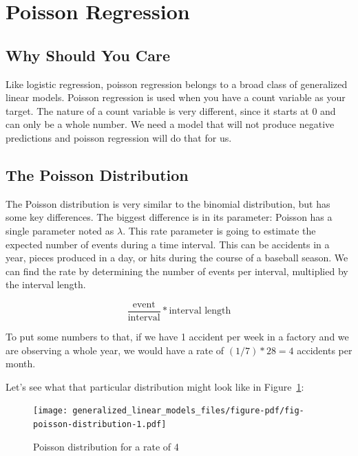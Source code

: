\documentclass[
  letterpaper,
]{krantz}
\begin{document}
\section{Poisson Regression}\label{poisson-regression}

\subsection{Why Should You Care}\label{why-should-you-care-1}

Like logistic regression, poisson regression belongs to a broad class of
generalized linear models. Poisson regression is used when you have a
count variable as your target. The nature of a count variable is very
different, since it starts at 0 and can only be a whole number. We need
a model that will not produce negative predictions and poisson
regression will do that for us.

\subsection{The Poisson Distribution}\label{the-poisson-distribution}

The Poisson distribution is very similar to the binomial distribution,
but has some key differences. The biggest difference is in its
parameter: Poisson has a single parameter noted as \(\lambda\). This
rate parameter is going to estimate the expected number of events during
a time interval. This can be accidents in a year, pieces produced in a
day, or hits during the course of a baseball season. We can find the
rate by determining the number of events per interval, multiplied by the
interval length.

\[\frac{\text{event}}{\text{interval}}*\text{interval length} \]

To put some numbers to that, if we have 1 accident per week in a factory
and we are observing a whole year, we would have a rate of
\((1 / 7) * 28 = 4\) accidents per month.

Let's see what that particular distribution might look like in
Figure~\ref{fig-poisson-distribution}:

\begin{figure}

{\centering \texttt{[image: generalized\_linear\_models\_files/figure-pdf/fig-poisson-distribution-1.pdf]}

}

\caption{\label{fig-poisson-distribution}Poisson distribution for a rate
of 4}

\end{figure}
\end{document}
